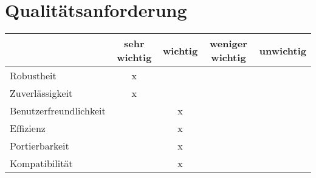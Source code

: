 \section{Qualitätsanforderung}

  \vspace{0.5cm}

  \begin{center}
     \begin{tabular}{|l||c|c|c|c|}
\hline
                   & sehr wichtig & wichtig & weniger wichtig & unwichtig \\
\hline
      Robustheit				& x & & &   \\
\hline
      Zuverlässigkeit			& x & & & \\
\hline
      Benutzerfreundlichkeit	& & x & &  \\
\hline
      Effizienz					& & x & & \\
\hline
      Portierbarkeit			& & x & & \\
\hline
      Kompatibilität			& & x & &  \\
\hline
     \end{tabular}
  \end{center}
